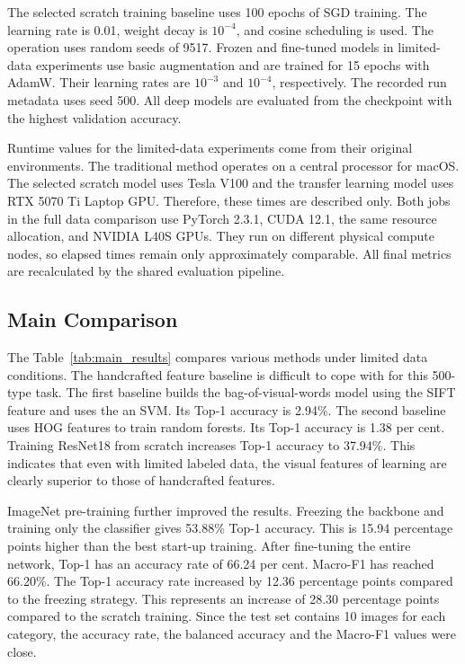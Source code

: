 The selected scratch training baseline uses 100 epochs of SGD training. The
learning rate is 0.01, weight decay is $10^{-4}$, and cosine scheduling is
used. The operation uses random seeds of 9517. Frozen and fine-tuned models in
limited-data experiments use basic augmentation and are trained for 15 epochs
with AdamW. Their learning rates are $10^{-3}$ and $10^{-4}$, respectively.
The recorded run metadata uses seed 500. All deep models are evaluated
from the checkpoint with the highest validation accuracy.

Runtime values for the limited-data experiments come from their original
environments. The traditional method operates on a central processor for
macOS. The selected scratch model uses Tesla V100 and the transfer learning
model uses RTX 5070 Ti Laptop GPU. Therefore, these times are described only.
Both jobs in the full data comparison use PyTorch 2.3.1, CUDA 12.1, the same
resource allocation, and NVIDIA L40S GPUs. They run on different physical
compute nodes, so elapsed times remain only approximately comparable. All
final metrics are recalculated by the shared evaluation pipeline.

\subsection{Main Comparison}
\label{sec:main_comparison}

The Table~\ref{tab:main_results} compares various methods under limited data
conditions. The handcrafted feature baseline is difficult to cope with for
this 500-type task. The first baseline builds the bag-of-visual-words model
using the SIFT feature and uses the an SVM. Its Top-1 accuracy is 2.94\%. The
second baseline uses HOG features to train random forests. Its Top-1 accuracy
is 1.38 per cent. Training ResNet18 from scratch increases Top-1 accuracy to
37.94\%. This indicates that even with limited labeled data, the visual
features of learning are clearly superior to those of handcrafted features.

ImageNet pre-training further improved the results. Freezing the backbone and
training only the classifier gives 53.88\% Top-1 accuracy. This is 15.94
percentage points higher than the best start-up training. After fine-tuning
the entire network, Top-1 has an accuracy rate of 66.24 per cent. Macro-F1 has
reached 66.20\%. The Top-1 accuracy rate increased by 12.36 percentage points
compared to the freezing strategy. This represents an increase of 28.30
percentage points compared to the scratch training. Since the test set
contains 10 images for each category, the accuracy rate, the balanced accuracy
and the Macro-F1 values were close.

